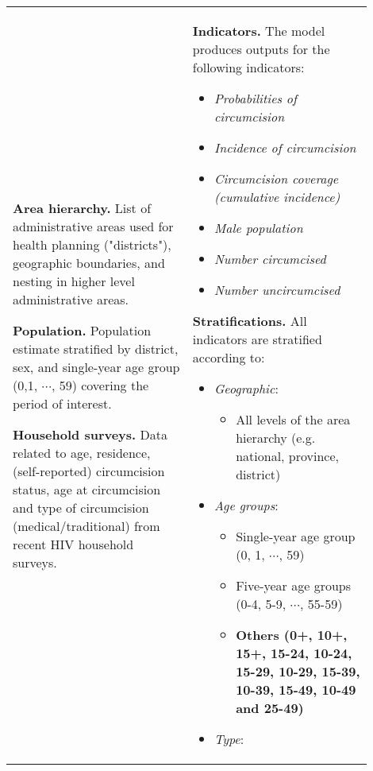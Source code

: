 \documentclass{article}
\begin{document}
\begin{appendix}
{\begin{table}[H]
\begin{tabular}{| p{0.45\linewidth} | p{0.45\linewidth} |}
			{\bf Area hierarchy.} List of administrative areas used for health planning ("districts"), geographic boundaries, and nesting in higher level administrative areas.
			\vspace{5pt}
			
			{\bf Population.} Population estimate stratified by district, sex, and single-year age group (0,1, $\cdots$, 59) covering the period of interest. 
			\vspace{5pt}
			
			{\bf Household surveys.} Data related to age, residence, (self-reported) circumcision status, age at circumcision and type of circumcision (medical/traditional) from recent HIV household surveys. 
			
		& 
			{\bf Indicators.}  The model produces outputs for the following indicators:
			\begin{itemize}
				\item {\it Probabilities of circumcision}
                \item {\it Incidence of circumcision}
				\item {\it Circumcision coverage (cumulative incidence)}
				\item {\it Male population}
				\item {\it Number circumcised}
				\item {\it Number uncircumcised}
			\end{itemize}
			\vspace{5pt}
			{\bf Stratifications.} All indicators are stratified according to: 
			\begin{itemize}
				\item {\it Geographic}: 
				\begin{itemize}
					\item All levels of the area hierarchy (e.g. national, province, district)
				\end{itemize}
				\item {\it Age groups}: 
				\begin{itemize}
					\item Single-year age group (0, 1, $\cdots$, 59)
					\item Five-year age groups (0-4, 5-9, $\cdots$, 55-59)
					\item {\color{red}\bf Others (0+, 10+, 15+, 15-24, 10-24, 15-29, 10-29, 15-39, 10-39, 15-49, 10-49 and 25-49)}
				\end{itemize}
				\item {\it Type}: 
				\begin{itemize}

\end{itemize}
\end{itemize}
\end{tabular}
\end{table}}
\end{appendix}
\end{document}
